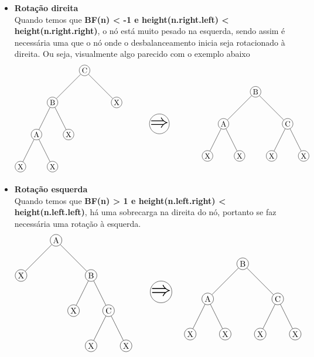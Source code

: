 \begin{itemize}
	\item \textbf{Rotação direita} \\
		Quando temos que \textbf{BF(n) < -1 e height(n.right.left) < height(n.right.right)}, o nó está muito pesado na esquerda, sendo assim é necessária uma que o nó onde o desbalanceamento inicia seja rotacionado à direita. Ou seja, visualmente algo parecido com o exemplo abaixo
	\begin{align*}
		\begin{tikzpicture}[
			every node/.style={circle, draw, minimum size=0.5cm, inner sep=0},
			level 1/.style={sibling distance=3cm},
			level 2/.style={sibling distance=1.5cm},
		]
		\node (tree1) at (0,0) {C}
			child {node {B}
				child {node {A}
					child {node {X}}
					child {node {X}}
				}
				child {node {X}}
			}
			child {node {X}};
			\node[style={}] (arrow) at (3.5,-2.5) {\Huge$\Rightarrow$};
		\node (tree2) at (8,-1) {B}
			child {node {A}
				child {node {X}}
				child {node {X}}
			}
			child {node {C}
				child {node {X}}
				child {node {X}}
			};
		\end{tikzpicture}
	\end{align*}

	\item \textbf{Rotação esquerda} \\
		Quando temos que \textbf{BF(n) > 1 e height(n.left.right) < height(n.left.left)}, há uma sobrecarga na direita do nó, portanto se faz necessária uma rotação à esquerda.
	\begin{align*}
		\begin{tikzpicture}[
			every node/.style={circle, draw, minimum size=0.5cm, inner sep=0},
			level 1/.style={sibling distance=3cm},
			level 2/.style={sibling distance=1.5cm},
		]
		\node (tree1) at (0,0) {A}
			child {node {X}
			}
			child {node {B}
				child {node {X}
				}
				child {node {C}
					child {node {X}}
					child {node {X}}
				}
			};
			\node[style={}] (arrow) at (4.5,-2.2) {\Huge$\Rightarrow$};
		\node (tree2) at (8,-1) {B}
			child {node {A}
				child {node {X}}
				child {node {X}}
			}
			child {node {C}
				child {node {X}}
				child {node {X}}
			};
		\end{tikzpicture}
	\end{align*}


\end{itemize}
